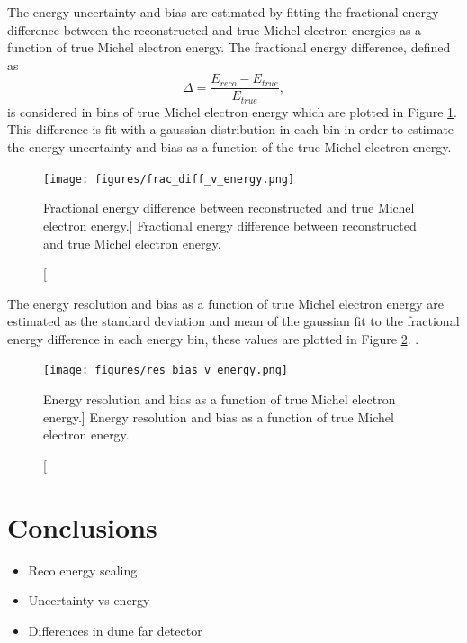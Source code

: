 
The energy uncertainty and bias are estimated by fitting the fractional energy 
difference between the reconstructed and true Michel electron energies as a 
function of true Michel electron energy. The fractional energy difference, 
defined as 
\begin{equation}
	\Delta = \frac{E_{reco} - E_{true}}{E_{true}},
\end{equation}
is considered in bins of true Michel electron energy which are plotted in Figure
\ref{fig:frac_diff_energy}. This difference is fit with a gaussian distribution in each
bin in order to estimate the energy uncertainty and bias as a function of the 
true Michel electron energy.
\begin{figure}
	\centering
	\texttt{[image: figures/frac\_diff\_v\_energy.png]}
	\caption
	[Fractional energy difference between reconstructed and true Michel electron
	energy.]
	{Fractional energy difference between reconstructed and true Michel electron
	energy.}
	\label{fig:frac_diff_energy}
\end{figure}

The energy resolution and bias as a function of true Michel electron energy are 
estimated as the standard deviation and mean of the gaussian fit to the
fractional energy difference in each energy bin, these values are plotted in
Figure \ref{fig:res_and_bias_energy}. .
\begin{figure}
	\centering
	\texttt{[image: figures/res\_bias\_v\_energy.png]}
	\caption
	[Energy resolution and bias as a function of true Michel electron energy.]
	{Energy resolution and bias as a function of true Michel electron energy.}
	\label{fig:res_and_bias_energy}
\end{figure}

\section{Conclusions} \label{ME_EU}
\begin{mccorrection}
	\begin{itemize}
		\item Reco energy scaling
		\item Uncertainty vs energy
		\item Differences in dune far detector
	\end{itemize}
\end{mccorrection}
